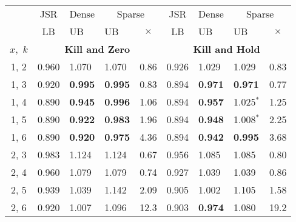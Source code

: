 \begin{tabular}{|c|clll|clll|}
\hline
\rowcolor{gray!50}
&{JSR\cite{vankeerberghen2014jsr}} &{Dense} & \multicolumn{2}{c|}{Sparse}
&{JSR\cite{vankeerberghen2014jsr}} &{Dense} & \multicolumn{2}{c|}{Sparse}\\
\rowcolor{gray!50}
\multirow{-2}{*}{$\overbar{\binom{m}{k}}^{\strat}$} 
&{LB} &{UB} &{UB} & \multicolumn{1}{c|}{$\times$}
&{LB} &{UB} &{UB} & \multicolumn{1}{c|}{$\times$}\\
\rowcolor{gray!15}
$x,$ $k$ & \multicolumn{4}{c|}{\textbf{Kill and Zero}} & \multicolumn{4}{c|}{\textbf{Kill and Hold}} \\
\hline
1, 2
& 0.960 &  1.070 & 1.070 & 0.86
& 0.926 &  1.029 & 1.029 & 0.83\\
\rowcolor{gray!15}
1, 3
& 0.920 & \textbf{0.995} & \textbf{0.995} & 0.83
& 0.894 & \textbf{0.971} & \textbf{0.971} & 0.77\\
1, 4
& 0.890 & \textbf{0.945} & \textbf{0.996} & 1.06
& 0.894 & \textbf{0.957} & 1.025$\mathbf{^*}$ & 1.25\\
\rowcolor{gray!15}
1, 5
& 0.890 & \textbf{0.922} & \textbf{0.983} & 1.96
& 0.894 & \textbf{0.948} & 1.008$\mathbf{^*}$ & 2.25\\
1, 6
& 0.890 & \textbf{0.920} & \textbf{0.975} & 4.36
& 0.894 & \textbf{0.942} & \textbf{0.995} & 3.68\\
\hline
\rowcolor{gray!15}
2, 3
& 0.983 & 1.124 & 1.124 & 0.67
& 0.956 & 1.085 & 1.085 & 0.80\\
2, 4
& 0.960 & 1.079 & 1.079 & 0.74
& 0.927 & 1.039 & 1.039 & 0.86\\
\rowcolor{gray!15}
2, 5
& 0.939 & 1.039 & 1.142 & 2.09
& 0.905 & 1.002 & 1.105 & 1.58\\
2, 6
& 0.920 & 1.007 & 1.096 & 12.3
& 0.903 & \textbf{0.974} & 1.080 & 19.2\\

\end{tabular}
